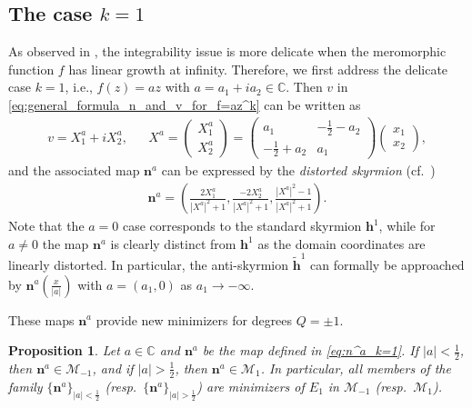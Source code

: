 \documentclass{amsart}
\numberwithin{equation}{section}
\newtheorem{proposition}[theorem]{Proposition}
\theoremstyle{definition}
\theoremstyle{remark}
\newcommand{\C}{\mathbb{C}}
\newcommand{\boM}{\mathcal{M}}
\newcommand{\bh}{{\mathbf{h}}}
\newcommand{\bn}{{\mathbf{n}}}
\begin{document}
\subsection{The case \texorpdfstring{$k=1$}{k=1}}

As observed in \cite{MR4091507}, the integrability issue is more delicate when the meromorphic function $f$ has linear growth at infinity.
Therefore, we first address the delicate case $k=1$, i.e., $f(z)= az$ with $a=a_1+ia_2\in\C$. 
Then $v$ in \eqref{eq:general_formula_n_and_v_for_f=az^k} can be written as 
\begin{align*} 
v= X_1^a + iX_2^a,&& X^a = 
\begin{pmatrix} 
X_1^a \\
X_2^a 
\end{pmatrix} 
= 
\begin{pmatrix} 
a_1 & -\frac12-a_2 \\ 
-\frac12+a_2 & a_1 
\end{pmatrix} 
\begin{pmatrix} 
x_1 \\
x_2 
\end{pmatrix},
\end{align*} 
and the associated map $\bn^a$ can be expressed by the \emph{distorted skyrmion} (cf.\ \cite{MR4091507}) 
\begin{align}\label{eq:n^a_k=1}
\bn^a = \left( \frac{2X_1^a}{|X^a|^2+1}, \frac{-2X_2^a}{|X^a|^2+1}, \frac{|X^a|^2-1}{|X^a|^2+1} \right). 
\end{align} 
Note that the $a=0$ case corresponds to the standard skyrmion $\bh^1$, while for $a\neq0$ the map $\bn^a$ is clearly distinct from $\bh^1$ as the domain coordinates are linearly distorted. 
In particular, the anti-skyrmion $\tilde{\bh}^1$ can formally be approached by $\bn^{a}(\frac{x}{|a|})$ with $a=(a_1,0)$ as $a_1\to-\infty$. 

These maps $\bn^a$ provide new minimizers for degrees $Q=\pm1$.

\begin{proposition}
    Let $a\in\C$ and $\bn^a$ be the map defined in \eqref{eq:n^a_k=1}.
    If $|a|<\frac12$, then $\bn^a\in \boM_{-1}$, and if $|a|>\frac12$, then $\bn^a\in \boM_{1}$.
    In particular, all members of the family $\{\bn^a\}_{|a|<\frac12}$ (resp.\ $\{\bn^a\}_{|a|>\frac12}$) are minimizers of $E_1$ in $\boM_{-1}$ (resp.\ $\boM_1$).
\end{proposition}
\end{document}
